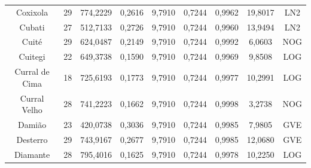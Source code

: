 \begin{table}[ht]
\begin{tabular}{ccccccccc}
Coxixola & 29 & 774,2229 & 0,2616 & 9,7910 & 0,7244 & 0,9962 & 19,8017 & LN2 \\
Cubati & 27 & 512,7133 & 0,2726 & 9,7910 & 0,7244 & 0,9960 & 13,9494 & LN2 \\
Cuité & 29 & 624,0487 & 0,2149 & 9,7910 & 0,7244 & 0,9992 & 6,0603 & NOG \\
Cuitegi & 22 & 649,3738 & 0,1590 & 9,7910 & 0,7244 & 0,9969 & 9,8508 & LOG \\
Curral de Cima & 18 & 725,6193 & 0,1773 & 9,7910 & 0,7244 & 0,9977 & 10,2991 & LOG \\
Curral Velho & 28 & 741,2223 & 0,1662 & 9,7910 & 0,7244 & 0,9998 & 3,2738 & NOG \\
Damião & 23 & 420,0738 & 0,3036 & 9,7910 & 0,7244 & 0,9985 & 7,9805 & GVE \\
Desterro & 29 & 743,9167 & 0,2677 & 9,7910 & 0,7244 & 0,9985 & 12,0680 & GVE \\
Diamante & 28 & 795,4016 & 0,1625 & 9,7910 & 0,7244 & 0,9978 & 10,2250 & LOG \\ \hline
\end{tabular}
\end{table}

\newpage


